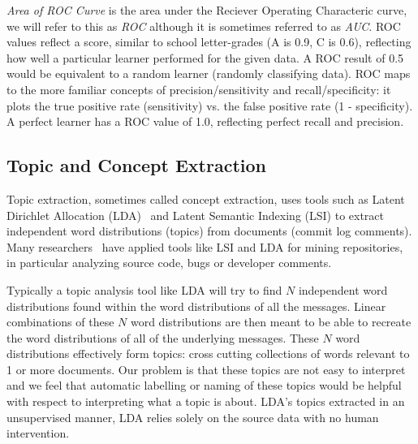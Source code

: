 \documentclass{acm_proc_article-sp}
\begin{document}
\emph{Area of ROC Curve} is the area under the Reciever Operating Characteric curve, we will refer to this as \emph{ROC} although it is sometimes referred to as \emph{AUC}. ROC values reflect a score, similar to school letter-grades (A is 0.9, C is 0.6), reflecting how well a particular learner performed for the given data. A ROC result of 0.5 would be equivalent to a random learner (randomly classifying data). ROC maps to the more familiar concepts of precision/sensitivity and recall/specificity: it plots the true positive rate (sensitivity) vs. the false positive rate (1 - specificity). A perfect learner has a ROC value of 1.0, reflecting perfect recall and precision.

\subsection{Topic and Concept Extraction}
Topic extraction, sometimes called concept extraction, uses tools such as Latent Dirichlet Allocation (LDA)~\cite{Blei2003} and Latent Semantic Indexing (LSI) to extract
independent word distributions (topics) from
	documents (commit log comments). Many researchers~\cite{marcus04wcre,Poshyvanyk2007,lukins08wcre,Linstead2007} have applied tools like LSI and LDA for mining repositories, in particular analyzing source code, bugs or developer comments.

Typically a topic analysis tool like LDA will try to find $N$ independent word distributions found within the word distributions of all the messages. Linear combinations of these $N$ word distributions are then meant to be able to recreate the word distributions of all of the underlying messages. These $N$ word distributions effectively form topics: cross cutting collections of words relevant to 1 or more documents. Our problem is that these topics are not easy to interpret and we feel that automatic labelling or naming of these topics would be helpful with respect to interpreting what a topic is about. LDA's topics extracted in an unsupervised manner, LDA relies solely on the source data with no human intervention.
\end{document}
